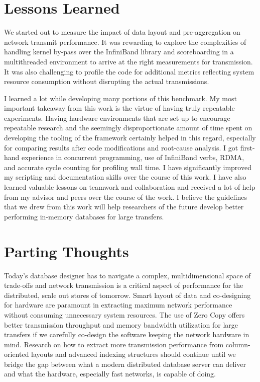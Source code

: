 \section{Lessons Learned}
We started out to measure the impact of data layout and pre-aggregation on network transmit performance. 
It was rewarding to explore the complexities of handling kernel by-pass over the InfiniBand library and 
scoreboarding in a multithreaded environment to arrive at the right measurements for transmission.
It was also challenging to profile the code for additional metrics reflecting system resource consumption 
without disrupting the actual transmissions. 

I learned a lot while developing many portions of this benchmark. My most important takeaway from this work 
is the virtue of having truly repeatable experiments. Having hardware environments that are set up to encourage 
repeatable research and the seemingly disproportionate amount of time spent on developing the tooling of the 
framework certainly helped in this regard, especially for comparing results after code modifications and root-cause analysis.
I got first-hand experience in concurrent programming, use of InfiniBand verbs, RDMA, and accurate cycle counting 
for profiling wall time. I have significantly improved my scripting and documentation skills over the course of this work. 
I have also learned valuable lessons on teamwork and collaboration and received a lot of help from my 
advisor and peers over the course of the work. I believe the guidelines that we drew from this work will 
help researchers of the future develop better performing in-memory databases for large transfers. 

\section{Parting Thoughts}
Today's database designer has to navigate a complex, multidimensional space of trade-offs and network transmission 
is a critical aspect of performance for the distributed, scale out stores of tomorrow. Smart layout of data and  
co-designing for hardware are paramount in extracting maximum network performance without consuming 
unnecessary system resources. The use of Zero Copy offers better transmission throughput and memory bandwidth utilization for 
large transfers if we carefully co-design the software keeping the network hardware in mind. Research on how to extract 
more transmission performance from column-oriented layouts and advanced indexing structures should continue until we bridge the 
gap between what a modern distributed database server can deliver and what the hardware, especially fast networks, is capable of doing.
